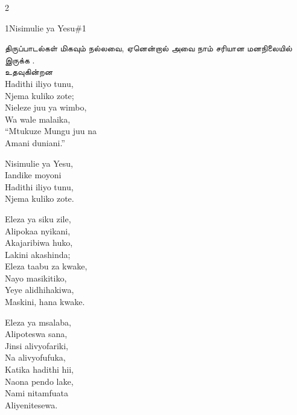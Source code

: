 \clearpage
\begin{multicols}{2}
\setlength{\columnseprule}{0.3pt}
\begin{hymn}{1}{Nisimulie ya Yesu}{\#1}
\begin{stanza}
திருப்பாடல்கள் மிகவும் நல்லவை, ஏனென்றால் அவை நாம் சரியான மனநிலையில் இருக்க .\\
உதவுகின்றன\\
Hadithi iliyo tunu,\\
Njema kuliko zote;\\
Nieleze juu ya wimbo,\\
Wa wale malaika,\\
``Mtukuze Mungu juu na\\
Amani duniani.''
\end{stanza}
\begin{chorus}
Nisimulie ya Yesu,\\
Iandike moyoni\\
Hadithi iliyo tunu,\\
Njema kuliko zote.
\end{chorus}
\begin{stanza}
Eleza ya siku zile,\\
Alipokaa nyikani,\\
Akajaribiwa huko,\\
Lakini akashinda;\\
Eleza taabu za kwake,\\
Nayo masikitiko,\\
Yeye alidhihakiwa,\\
Maskini, hana kwake.
\end{stanza}
\begin{stanza}
Eleza ya msalaba,\\
Alipoteswa sana,\\
Jinsi alivyofariki,\\
Na alivyofufuka,\\
Katika hadithi hii,\\
Naona pendo lake,\\
Nami nitamfuata\\
Aliyenitesewa.
\end{stanza}
\end{hymn}


\end{multicols}
